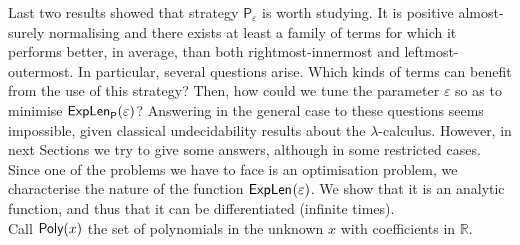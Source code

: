 Last two results showed that strategy $\mathsf{P}_\varepsilon$ is worth studying. It is positive almost-surely normalising and there exists at least a family of terms for which it performs better, in average, than both rightmost-innermost and leftmost-outermost. In particular, several questions arise. Which kinds of terms can benefit from the use of this strategy? Then, how could we tune the parameter $\varepsilon$ so as to minimise $\textsf{ExpLen}_{\mathsf{P}}(\varepsilon)$? Answering in the general case to these questions seems impossible, given classical undecidability results about the $\lambda$-calculus. However, in next Sections we try to give some answers, although in some restricted cases.\\
Since one of the problems we have to face is an optimisation problem, we characterise the nature of the function $\textsf{ExpLen}_{}(\varepsilon)$. We show that it is an analytic function, and thus that it can be differentiated (infinite times).\\
Call $\textsf{Poly}(x)$ the set of polynomials in the unknown $x$ with coefficients in $\mathbb{R}$.
